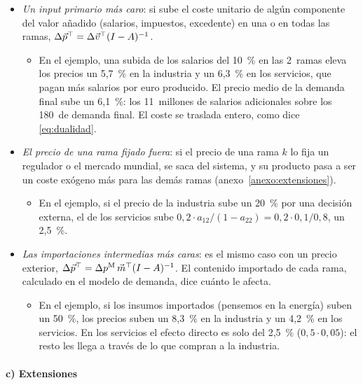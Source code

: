 \documentclass[11pt]{article}
\begin{document}
\begin{itemize}
\item \emph{Un input primario más caro}: si sube el coste unitario de algún componente del valor añadido (salarios, impuestos, excedente) en una o en todas las ramas, $\Delta\vec{p}^{\top}=\Delta\vec{v}^{\top}(I-A)^{-1}$.
  \begin{itemize}
  \item En el ejemplo, una subida de los salarios del 10~\% en las 2~ramas eleva los precios un 5,7~\% en la industria y un 6,3~\% en los servicios, que pagan más salarios por euro producido. El precio medio de la demanda final sube un 6,1~\%: los 11~millones de salarios adicionales sobre los 180~de demanda final. El coste se traslada entero, como dice \eqref{eq:dualidad}.
  \end{itemize}
\item \emph{El precio de una rama fijado fuera}: si el precio de una rama $k$ lo fija un regulador o el mercado mundial, se saca del sistema, y su producto pasa a ser un coste exógeno más para las demás ramas (anexo~\ref{anexo:extensiones}).
  \begin{itemize}
  \item En el ejemplo, si el precio de la industria sube un 20~\% por una decisión externa, el de los servicios sube $0{,}2\cdot a_{12}/(1-a_{22})=0{,}2\cdot0{,}1/0{,}8$, un 2,5~\%.
  \end{itemize}
\item \emph{Las importaciones intermedias más caras}: es el mismo caso con un precio exterior, $\Delta\vec{p}^{\top}=\Delta p^{\mathrm M}\,\vec{m}^{\top}(I-A)^{-1}$. El contenido importado de cada rama, calculado en el modelo de demanda, dice cuánto le afecta.
  \begin{itemize}
  \item En el ejemplo, si los insumos importados (pensemos en la energía) suben un 50~\%, los precios suben un 8,3~\% en la industria y un 4,2~\% en los servicios. En los servicios el efecto directo es solo del 2,5~\% ($0{,}5\cdot0{,}05$): el resto les llega a través de lo que compran a la industria.
  \end{itemize}
\end{itemize}

\paragraph{c) Extensiones}
\end{document}
